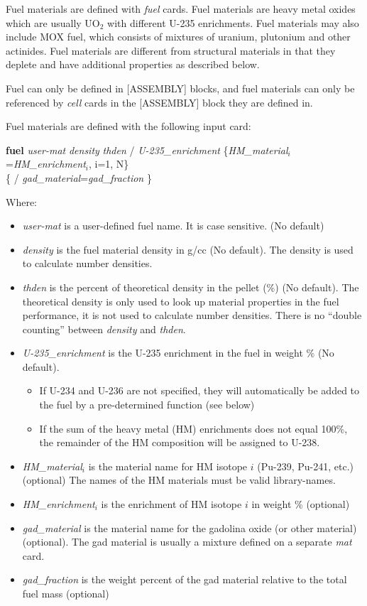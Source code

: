 Fuel materials are defined with {\it fuel} cards.
Fuel materials are heavy metal oxides which are usually UO$_2$ with different U-235 enrichments.
Fuel materials may also include MOX fuel, which consists of mixtures of uranium, plutonium and other actinides.
Fuel materials are different from structural materials in that they deplete and have
additional properties as described below.

Fuel can only be defined in [ASSEMBLY] blocks, and fuel materials can only be referenced by {\it cell} cards
in the [ASSEMBLY] block they are defined in.

Fuel materials are defined with the following input card:

{\bf fuel} {\it user-mat} {\it density} {\it thden} / {\it U-235\_enrichment}
    \{{\it HM\_material$_i$}={\it HM\_enrichment$_i$}, i=1, N\}  \\
   \{ / {\it gad\_material}={\it gad\_fraction} \}

Where:

\begin{itemize}   %
  \item {\it user-mat} is a user-defined fuel name. It is case sensitive. (No default)
  \item {\it density} is the fuel material density in g/cc (No default).
     The density is used to calculate number densities.
  \item {\it thden} is the percent of theoretical density in the pellet (\%) (No default).
   The theoretical density is only used to look up material properties in the fuel performance,
   it is not used to calculate number densities.  There is no ``double counting'' between
   {\it density} and {\it thden}.
  \item {\it U-235\_enrichment} is the U-235 enrichment in the fuel in weight \%  (No default).
  \begin{itemize}   %
    \item If U-234 and U-236 are not specified, they will automatically be added to the
       fuel by a pre-determined function (see below)
    \item If the sum of the heavy metal (HM) enrichments does not equal 100\%, the remainder of the
        HM composition will be assigned to U-238.
  \end{itemize}
  \item {\it HM\_material$_i$} is the material name for HM isotope $i$ (Pu-239, Pu-241, etc.) (optional) 
    The names of the HM materials must be valid library-names.
  \item {\it HM\_enrichment$_i$} is the enrichment of HM isotope $i$ in weight \% (optional)
  \item {\it gad\_material} is the material name for the gadolina oxide (or other material) (optional).
        The gad material is usually a mixture defined on a separate {\it mat} card.
  \item {\it gad\_fraction} is the weight percent of the gad material relative to the total fuel mass (optional)
\end{itemize}

